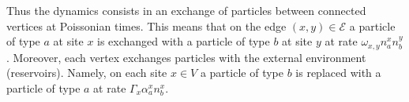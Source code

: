 \documentclass[10pt]{article}
\numberwithin{equation}{section}
\numberwithin{equation}{subsection}
\begin{document}
Thus the dynamics consists in an exchange of particles between connected vertices at Poissonian times. 
This means that on the edge $(x,y)\in \mathcal{E}$  a particle of type $a$ at site $x$ is exchanged with a particle of type $b$ at site $y$ at rate $\omega_{x,y}n_{a}^{x}n_{b}^{y}$. 
Moreover, each vertex  exchanges particles with the external environment (reservoirs). 
Namely, on each site $x\in V$  a particle of type $b$ is replaced with a particle of type $a$ at rate $\Gamma_{x}\alpha_{a}^{x}n_{b}^{x}$. 
%
\end{document}
